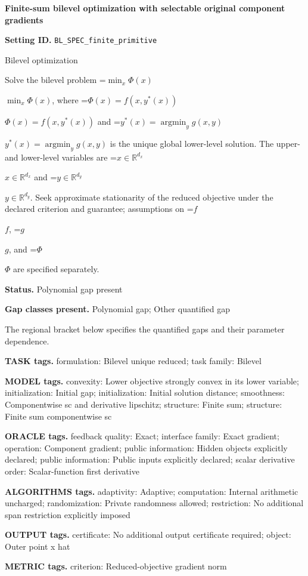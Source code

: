 \documentclass[10pt,a4paper]{article}
\newcommand{\AtlasMath}[1]{\par\begingroup\centering\setbox0=\hbox{$\displaystyle #1$}\ifdim\wd0>1.4\linewidth\typeout{ATLAS WIDE FORMULA: \the\wd0}\fi\ifdim\wd0>\linewidth\resizebox{\linewidth}{!}{\box0}\else\box0\fi\par\endgroup}
\newcommand{\AtlasInlineMath}[1]{\begingroup\setbox0=\hbox{$#1$}\ifdim\wd0>.4\linewidth\endgroup\AtlasMath{#1}\else\endgroup$#1$\fi}
\begin{document}
\raggedright

{\LARGE\bfseries\sffamily\color{AtlasNavy} Finite-sum bilevel optimization with selectable original component gradients\par}\vspace{5pt}
\textbf{Setting ID.} \texttt{BL\_\allowbreak{}SPEC\_\allowbreak{}finite\_\allowbreak{}primitive}

Bilevel optimization

Solve the bilevel problem \AtlasInlineMath{\min_x\Phi(x)}, where \AtlasInlineMath{\Phi(x)=f(x,y^*(x))} and \AtlasInlineMath{y^*(x)=\operatorname*{argmin}_y g(x,y)} is the unique global lower-level solution. The upper- and lower-level variables are \AtlasInlineMath{x\in\mathbb{R}^{d_x}} and \AtlasInlineMath{y\in\mathbb{R}^{d_y}}. Seek approximate stationarity of the reduced objective under the declared criterion and guarantee; assumptions on \AtlasInlineMath{f}, \AtlasInlineMath{g}, and \AtlasInlineMath{\Phi} are specified separately.

\textbf{Status.} Polynomial gap present

\textbf{Gap classes present.} Polynomial gap; Other quantified gap

The regional bracket below specifies the quantified gaps and their parameter dependence.

\textbf{TASK tags.} formulation: Bilevel unique reduced; task family: Bilevel

\textbf{MODEL tags.} convexity: Lower objective strongly convex in its lower variable; initialization: Initial gap; initialization: Initial solution distance; smoothness: Componentwise sc and derivative lipschitz; structure: Finite sum; structure: Finite sum componentwise sc

\textbf{ORACLE tags.} feedback quality: Exact; interface family: Exact gradient; operation: Component gradient; public information: Hidden objects explicitly declared; public information: Public inputs explicitly declared; scalar derivative order: Scalar-function first derivative

\textbf{ALGORITHMS tags.} adaptivity: Adaptive; computation: Internal arithmetic uncharged; randomization: Private randomness allowed; restriction: No additional span restriction explicitly imposed

\textbf{OUTPUT tags.} certificate: No additional output certificate required; object: Outer point x hat

\textbf{METRIC tags.} criterion: Reduced-objective gradient norm
\end{document}

